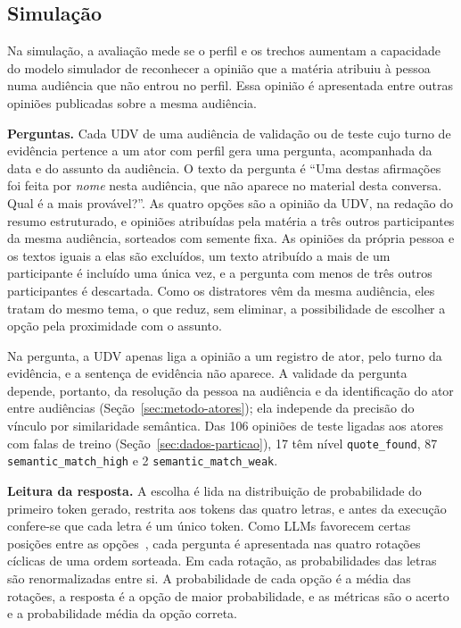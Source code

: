 \subsection{Simulação}
\label{sec:setup-simulacao}

Na simulação, a avaliação mede se o perfil e os trechos aumentam a capacidade do modelo simulador de
reconhecer a opinião que a matéria atribuiu à pessoa numa audiência que não entrou no perfil. Essa
opinião é apresentada entre outras opiniões publicadas sobre a mesma audiência.

\textbf{Perguntas.} Cada UDV de uma audiência de validação ou de teste cujo turno de evidência
pertence a um ator com perfil gera uma pergunta, acompanhada da data e do assunto da audiência. O
texto da pergunta é ``Uma destas afirmações foi feita por \textit{nome} nesta audiência, que não
aparece no material desta conversa. Qual é a mais provável?''. As quatro opções são a opinião da
UDV, na redação do resumo estruturado, e opiniões atribuídas pela matéria a três outros participantes
da mesma audiência, sorteados com semente fixa. As opiniões da própria pessoa e os textos iguais a
elas são excluídos, um texto atribuído a mais de um participante é incluído uma única vez, e a
pergunta com menos de três outros participantes é descartada. Como os distratores vêm da mesma
audiência, eles tratam do mesmo tema, o que reduz, sem eliminar, a possibilidade de escolher a opção
pela proximidade com o assunto.

Na pergunta, a UDV apenas liga a opinião a um registro de ator, pelo turno da evidência, e a
sentença de evidência não aparece. A validade da pergunta depende, portanto, da resolução da pessoa
na audiência e da identificação do ator entre audiências (Seção~\ref{sec:metodo-atores}); ela
independe da precisão do vínculo por similaridade semântica. Das 106 opiniões de teste ligadas aos
atores com falas de treino (Seção~\ref{sec:dados-particao}), 17 têm nível \texttt{quote\_found}, 87
\texttt{semantic\_match\_high} e 2 \texttt{semantic\_match\_weak}.

\textbf{Leitura da resposta.} A escolha é lida na distribuição de probabilidade do primeiro token
gerado, restrita aos tokens das quatro letras, e antes da execução confere-se que cada letra é um
único token. Como LLMs favorecem certas posições entre as
opções~\citep{zheng2024large,pezeshkpour2024large}, cada pergunta é apresentada nas quatro rotações
cíclicas de uma ordem sorteada. Em cada rotação, as probabilidades das letras são renormalizadas
entre si. A probabilidade de cada opção é a
média das rotações, a resposta é a opção de maior probabilidade, e as métricas são o acerto e a
probabilidade média da opção correta.

